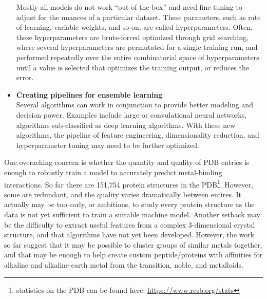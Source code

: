 \documentclass[../main/main]{subfiles}
\begin{document}
\begin{itemize}
	Mostly all models do not work ``out of the box'' and need fine tuning to adjust for the nuances of a particular dataset. These parameters, such as rate of learning, variable weights, and so on, are called hyperparameters. Often, these hyperparameters are brute-forced optimized through grid searching, where several hyperparameters are permutated for a single training run, and performed repeatedly over the entire combinatorial space of hyperparameters until a value is selected that optimizes the training output, or reduces the error.
	\item \textbf{Creating pipelines for ensemble learning} \\
	Several algorithms can work in conjunction to provide better modeling and decision power. Examples include large or convulational neural networks, algorithms sub-classified as deep learning algorithms. With these new algorithms, the pipeline of feature engineering, dimensionality reduction, and hyperparameter tuning may need to be further optimized.
\end{itemize}

One overaching concern is whether the quantity and quality of PDB entries is enough to robustly train a model to accurately predict metal-binding interactions. So far there are 151,754 protein structures in the PDB\footnote{
	statistics on the PDB can be found here: \url{https://www.rcsb.org/stats}
}. However, some are redundant, and the quality varies dramatically between entires. It actually may be too early, or ambitious, to study every protein structure as the data is not yet sufficient to train a suitable machine model. Another setback may be the difficulty to extract useful features from a complex 3-dimensional crystal structure, and that algorithms have not yet been developed. However, the work so far suggest that it may be possible to cluster groups of similar metals together, and that may be enough to help create custom peptide/proteins with affinities for alkaline and alkaline-earth metal from the transition, noble, and metalloids.

\printbibliography[title=References]
\end{document}
